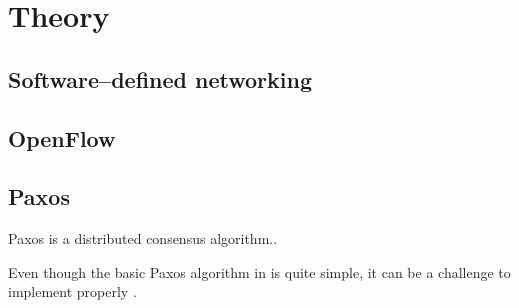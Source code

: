 \chapter{Theory}

\section{Software--defined networking}

\section{OpenFlow}

\section{Paxos}
Paxos is a distributed consensus algorithm..

Even though the basic Paxos algorithm in \cite{Lam01} is quite simple, it can be
a challenge to implement properly \cite{Chandra:2007:PML:1281100.1281103}.

